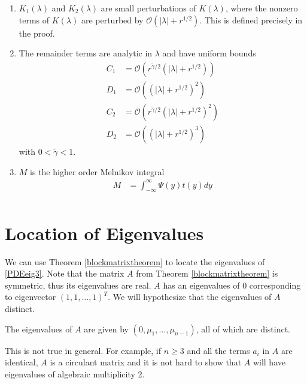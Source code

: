 \documentclass[thesis.tex]{subfiles}
\begin{document}
\begin{theorem}
\begin{enumerate}
\item $K_1(\lambda)$ and $K_2(\lambda)$ are small perturbations of $K(\lambda)$, where the nonzero terms of $K(\lambda)$ are perturbed by $\mathcal{O}(|\lambda| + r^{1/2})$. This is defined precisely in the proof.

\item The remainder terms are analytic in $\lambda$ and have uniform bounds
\begin{align*}
C_1 &= \mathcal{O}\left(r^{\tilde{\gamma}/2}(|\lambda| + r^{1/2})\right) \\
D_1 &= \mathcal{O}\left((|\lambda| + r^{1/2})^2\right) \\
C_2 &= \mathcal{O}\left(r^{\tilde{\gamma}/2}(|\lambda| + r^{1/2})^2\right) \\
D_2 &= \mathcal{O}\left((|\lambda| + r^{1/2})^3\right)
\end{align*}
with $0 < \tilde{\gamma} < 1$.

\item $M$ is the higher order Melnikov integral
\begin{align*}
M &= \int_{-\infty}^\infty \Psi(y) t(y) dy \\
\end{align*}

\end{enumerate}
\end{theorem}

\section{Location of Eigenvalues}

We can use Theorem \ref{blockmatrixtheorem} to locate the eigenvalues of \eqref{PDEeig3}. Note that the matrix $A$ from Theorem \ref{blockmatrixtheorem} is symmetric, thus its eigenvalues are real. $A$ has an eigenvalues of 0 corresponding to eigenvector $(1, 1, \dots, 1)^T$. We will hypothesize that the eigenvalues of $A$ distinct. 

\begin{hypothesis}\label{Adistincteigs}
The eigenvalues of $A$ are given by $(0, \mu_1, \dots, \mu_{n-1})$, all of which are distinct.
\end{hypothesis}

This is not true in general. For example, if $n \geq 3$ and all the terms $a_i$ in $A$ are identical, $A$ is a circulant matrix and it is not hard to show that $A$ will have eigenvalues of algebraic multiplicity 2.
\end{document}
